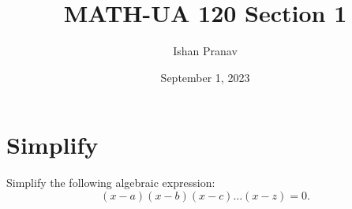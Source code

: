 \documentclass[12pt]{article}
\title{MATH-UA 120 Section 1}
\author{Ishan Pranav}
\date{September 1, 2023}
\begin{document}
\maketitle
\section{Simplify}
Simplify the following algebraic expression:
\[(x-a)(x-b)(x-c)\dots(x-z)=0.\]
\end{document}
